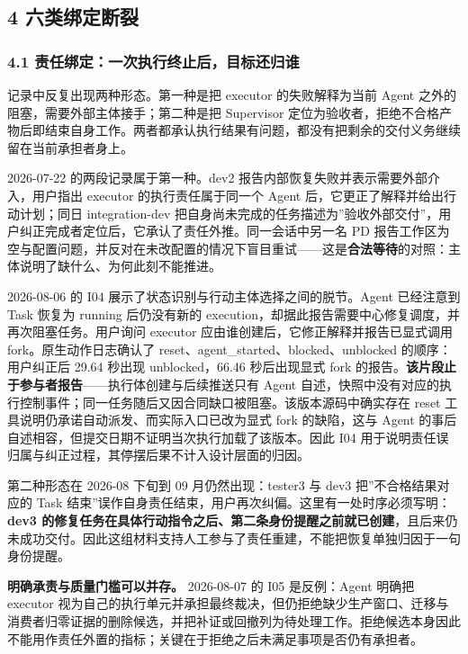 \documentclass[
]{article}
\begin{document}
\subsection{4 六类绑定断裂}\label{ux516dux7c7bux7ed1ux5b9aux65adux88c2}

\subsubsection{4.1
责任绑定：一次执行终止后，目标还归谁}\label{ux8d23ux4efbux7ed1ux5b9aux4e00ux6b21ux6267ux884cux7ec8ux6b62ux540eux76eeux6807ux8fd8ux5f52ux8c01}

记录中反复出现两种形态。第一种是把 executor 的失败解释为当前 Agent
之外的阻塞，需要外部主体接手；第二种是把 Supervisor
定位为验收者，拒绝不合格产物后即结束自身工作。两者都承认执行结果有问题，都没有把剩余的交付义务继续留在当前承担者身上。

2026-07-22 的两段记录属于第一种。dev2
报告内部恢复失败并表示需要外部介入，用户指出 executor
的执行责任属于同一个 Agent 后，它更正了解释并给出行动计划；同日
integration-dev
把自身尚未完成的任务描述为''验收外部交付''，用户纠正完成者定位后，它承认了责任外推。同一会话中另一名
PD
报告工作区为空与配置问题，并反对在未改配置的情况下盲目重试------这是\textbf{合法等待}的对照：主体说明了缺什么、为何此刻不能推进。

2026-08-06 的 I04 展示了状态识别与行动主体选择之间的脱节。Agent
已经注意到 Task 恢复为 running 后仍没有新的
execution，却据此报告需要中心修复调度，并再次阻塞任务。用户询问 executor
应由谁创建后，它修正解释并报告已显式调用 fork。原生动作日志确认了
reset、agent\_started、blocked、unblocked 的顺序：用户纠正后 29.64
秒出现 unblocked，66.46 秒后出现显式 fork
的报告。\textbf{该片段止于参与者报告}------执行体创建与后续推送只有
Agent
自述，快照中没有对应的执行控制事件；同一任务随后又因合同缺口被阻塞。该版本源码中确实存在
reset 工具说明仍承诺自动派发、而实际入口已改为显式 fork 的缺陷，这与
Agent 的事后自述相容，但提交日期不证明当次执行加载了该版本。因此 I04
用于说明责任误归属与纠正过程，其停摆后果不计入设计层面的归因。

第二种形态在 2026-08 下旬到 09 月仍然出现：tester3 与 dev3
把''不合格结果对应的 Task
结束''误作自身责任结束，用户再次纠偏。这里有一处时序必须写明：\textbf{dev3
的修复任务在具体行动指令之后、第二条身份提醒之前就已创建}，且后来仍未成功交付。因此这组材料支持人工参与了责任重建，不能把恢复单独归因于一句身份提醒。

\textbf{明确承责与质量门槛可以并存。} 2026-08-07 的 I05 是反例：Agent
明确把 executor
视为自己的执行单元并承担最终裁决，但仍拒绝缺少生产窗口、迁移与消费者归零证据的删除候选，并把补证或回撤列为待处理工作。拒绝候选本身因此不能用作责任外置的指标；关键在于拒绝之后未满足事项是否仍有承担者。
\end{document}
